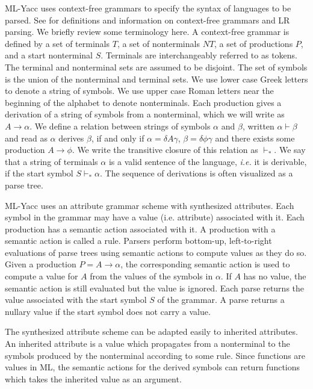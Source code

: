 ML-Yacc uses context-free grammars to specify the syntax of languages to
be parsed.  See \cite{ahu} for definitions and information on context-free
grammars and LR parsing.  We briefly review some terminology here.  A
context-free grammar is defined by a set of terminals $T$, a set of
nonterminals $NT$, a set of productions $P$, and a start
nonterminal $S$.  
Terminals are interchangeably referred to as tokens.  The terminal
and nonterminal sets are assumed to be disjoint.  The set of symbols is the
union of the nonterminal and terminal sets.  We use lower case
Greek letters to denote a string of symbols.  We use upper case
Roman letters near the beginning of the alphabet to denote nonterminals.
Each production gives a
derivation of a string of symbols from a nonterminal, which we will
write as $A \rightarrow \alpha$.  We define a relation between strings of
symbols $\alpha$ and $\beta$, written $\alpha \vdash \beta$ and read
as $\alpha$ derives $\beta$, if and only if $\alpha = \delta A \gamma$,
$\beta = \delta \phi \gamma$ and 
there exists some production $A \rightarrow \phi$.  We write the
transitive closure of this relation as 
$\vdash_*$. We say that a string of terminals $\alpha$ is a valid sentence
of the language, {\em i.e.} it is derivable, if the start symbol
$S \vdash_* \alpha$.   The sequence of derivations is often
visualized as a parse tree.

ML-Yacc uses an attribute grammar scheme with synthesized attributes.
Each symbol in the grammar may have a value (i.e. attribute) associated
with it.  Each production has a semantic action associated with it.
A production with a semantic action is called a rule. 
Parsers perform bottom-up, left-to-right evaluations of parse trees using semantic
actions to compute values as they do so.  Given a production
$P = A \rightarrow \alpha$, the corresponding semantic action is
used to compute a value for $A$ from the values of the symbols in $\alpha$.
If $A$ has no value, the semantic action is still evaluated but the value is ignored.
Each parse returns the value associated with the start symbol $S$ of the
grammar.  A parse returns a nullary value if the start symbol does not carry a value.

The synthesized attribute scheme can be adapted easily to inherited
attributes. An inherited attribute is a value which propagates from
a nonterminal to the symbols produced by the nonterminal according to
some rule.  Since functions are values in ML,
the semantic actions for the derived symbols
can return functions which takes the
inherited value as an argument.

